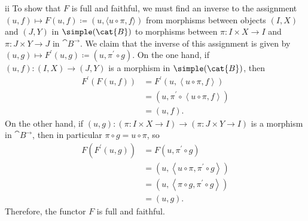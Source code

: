 \begin{partsolution}{ii}
To show that \(F\) is full and faithful, we must find an inverse to the assignment \((u,f) \mapsto F(u, f) \coloneq (u, \langle u\circ\pi,f\rangle)\) from morphisms between objects \((I, X)\) and \((J, Y)\) in \(\simple(\cat{B})\) to morphisms between \(\pi : I \times X \to I\) and \(\pi : J \times Y \to J\) in \(\cat{B}^\rightarrow\).
We claim that the inverse of this assignment is given by \((u, g) \mapsto F^\prime(u, g) \coloneq (u, \pi^\prime \circ g)\).
On the one hand, if \((u, f) : (I, X) \to (J, Y)\) is a morphism in \(\simple(\cat{B})\), then
\begin{align*}
F^\prime(F(u, f))
&= F^\prime\left(u, \left\langle u\circ\pi,f\right\rangle\right) \\
&= \left(u, \pi^\prime \circ \left\langle u\circ\pi,f\right\rangle\right) \\
&= (u, f).
\end{align*}
On the other hand, if \((u, g) : (\pi : I \times X \to I) \to (\pi : J \times Y \to I)\) is a morphism in \(\cat{B}^\rightarrow\), then in particular \(\pi \circ g = u \circ \pi\), so
\begin{align*}
F(F^\prime(u, g))
&= F\left(u, \pi^\prime \circ g\right) \\
&= \left(u, \left\langle u\circ\pi, \pi^\prime \circ g\right\rangle\right) \\
&= \left(u, \left\langle \pi \circ g, \pi^\prime \circ g\right\rangle\right) \\
&= (u, g).
\end{align*}
Therefore, the functor \(F\) is full and faithful.


\end{partsolution}
